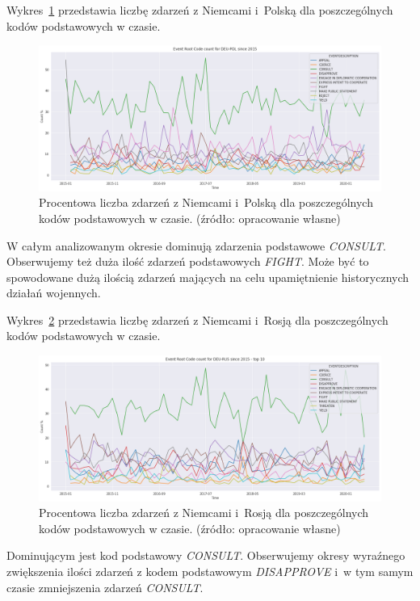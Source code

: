\documentclass[11pt]{report}
\begin{document}
    Wykres~\ref{fig:DEUPOLERC} przedstawia liczbę zdarzeń z Niemcami i~Polską dla poszczególnych kodów podstawowych w czasie.
    \begin{figure}[!htp]
        \centering
        \includegraphics[width=\linewidth]{fig/DEU/DEUPOLERCperc.png}
        \caption{Procentowa liczba zdarzeń z Niemcami i~Polską dla poszczególnych kodów podstawowych w czasie. (źródło: opracowanie własne)}
        \label{fig:DEUPOLERC}
    \end{figure}
    W całym analizowanym okresie dominują zdarzenia podstawowe \textit{CONSULT}.
    Obserwujemy też duża ilość zdarzeń podstawowych \textit{FIGHT}.
    Może być to spowodowane dużą ilością zdarzeń mających na celu upamiętnienie historycznych działań wojennych.

    Wykres~\ref{fig:DEURUSERC} przedstawia liczbę zdarzeń z Niemcami i~Rosją dla poszczególnych kodów podstawowych w czasie.
    \begin{figure}[!htp]
        \centering
        \includegraphics[width=\linewidth]{fig/DEU/DEURUSERCperc.png}
        \caption{Procentowa liczba zdarzeń z Niemcami i~Rosją dla poszczególnych kodów podstawowych w czasie. (źródło: opracowanie własne)}
        \label{fig:DEURUSERC}
    \end{figure}
    Dominującym jest kod podstawowy \textit{CONSULT}.
    Obserwujemy okresy wyraźnego zwiększenia ilości zdarzeń z kodem podstawowym \textit{DISAPPROVE} i~w tym samym czasie zmniejszenia zdarzeń \textit{CONSULT}.
\end{document}
